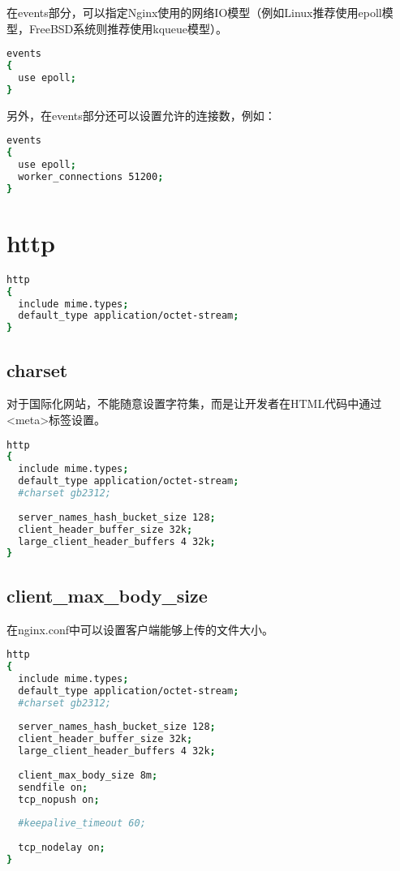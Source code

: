 在events部分，可以指定Nginx使用的网络IO模型（例如Linux推荐使用epoll模型，FreeBSD系统则推荐使用kqueue模型）。



\begin{lstlisting}[language=bash]
events
{
  use epoll;
}
\end{lstlisting}

另外，在events部分还可以设置允许的连接数，例如：


\begin{lstlisting}[language=bash]
events
{
  use epoll;
  worker_connections 51200;
}
\end{lstlisting}


\section{http}




\begin{lstlisting}[language=bash]
http
{
  include mime.types;
  default_type application/octet-stream;
}
\end{lstlisting}

\subsection{charset}

对于国际化网站，不能随意设置字符集，而是让开发者在HTML代码中通过<meta>标签设置。



\begin{lstlisting}[language=bash]
http
{
  include mime.types;
  default_type application/octet-stream;
  #charset gb2312;
  
  server_names_hash_bucket_size 128;
  client_header_buffer_size 32k;
  large_client_header_buffers 4 32k;
}
\end{lstlisting}


\subsection{client\_max\_body\_size}

在nginx.conf中可以设置客户端能够上传的文件大小。


\begin{lstlisting}[language=bash]
http
{
  include mime.types;
  default_type application/octet-stream;
  #charset gb2312;
  
  server_names_hash_bucket_size 128;
  client_header_buffer_size 32k;
  large_client_header_buffers 4 32k;
  
  client_max_body_size 8m;
  sendfile on;
  tcp_nopush on;
  
  #keepalive_timeout 60;
  
  tcp_nodelay on;
}
\end{lstlisting}


